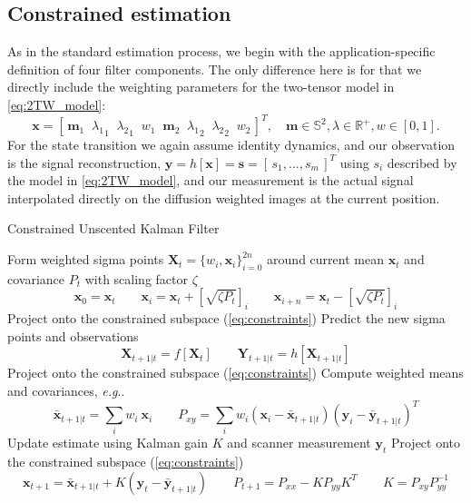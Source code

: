 \documentclass[final,hyperref]{gatech-thesis}
\makeatletter
\renewcommand{\v}[1]{\ensuremath{\mathbf #1}\xspace}
\newcommand{\rv}[1]{\ensuremath{[\, #1 \,]}\xspace} %
\DeclareRobustCommand\onedot{\futurelet\@let@token\@onedot}
\def\@onedot{\ifx\@let@token.\else.\null\fi\xspace}
\newcommand{\eg}{\textit{e.g}\onedot}
\newcommand{\R}{\ensuremath{\mathbb R}}
\renewcommand{\S}{\ensuremath{\mathbb S}}
\newcommand{\s}{\v s}
\newcommand{\m}{\v m}
\newcommand{\lx}{{\ensuremath{\lambda_1}} \xspace}
\newcommand{\ly}{{\ensuremath{\lambda_2}} \xspace}
\newcommand{\x}{\v x}
\newcommand{\y}{\v y}
\newcommand{\X}{\v X}
\newcommand{\Y}{\v Y}
\makeatother
\begin{document}
\subsection{Constrained estimation} \label{sec:cukf}

As in the standard estimation process, we begin with the application-specific
definition of four filter components.  The only difference here is for that we
directly include the weighting parameters for the two-tensor model in
\autoref{eq:2TW_model}:
\begin{equation} \label{eq:2TW_state}
  \x = \rv{ \m_1 \;\; \lx_1 \;\; \ly_1 \;\; w_1 \;\;
            \m_2 \;\; \lx_2 \;\; \ly_2 \;\; w_2 }^T ,
  \quad
  \m\in\S^2, \lambda\in\R^{+}, w\in[0,1] .
\end{equation}
For the state transition we again assume identity dynamics, and our
observation is the signal reconstruction, $\y=h[\x]=\s=\rv{s_1,...,s_m}^T$
using $s_i$ described by the model in \autoref{eq:2TW_model}, and our
measurement is the actual signal interpolated directly on the diffusion
weighted images at the current position.

\begin{algorithm}[t]
  \setlength\abovedisplayskip{2pt}
  \setlength\belowdisplayskip{2pt}
  \caption{Constrained Unscented Kalman Filter}
  \label{alg:cukf}
  \begin{algorithmic}[1]
    \STATE Form weighted sigma points $\X_t=\{w_i, \x_i\}_{i=0}^{2n}$ around
    current mean $\x_t$ and covariance $P_t$ with scaling factor $\zeta$
    \begin{equation*}
      \x_0 = \x_t
      \qquad
      \x_i    = \x_t + [\sqrt{\zeta P_t}]_i
      \qquad
      \x_{i+n} = \x_t - [\sqrt{\zeta P_t}]_i
    \end{equation*}
    \STATE Project onto the constrained subspace (\autoref{eq:constraints})
    \STATE Predict the new sigma points and observations
    \begin{equation*}
      \X_{t+1|t} = f[\X_t]   \qquad   \Y_{t+1|t} = h[\X_{t+1|t}]
    \end{equation*}
    \STATE Project onto the constrained subspace (\autoref{eq:constraints})
    \STATE Compute weighted means and covariances, \eg
    \begin{equation*}
      \bar{\x}_{t+1|t} = \sum_i w_i ~ \x_i
      \qquad
      P_{xy} = \sum_i w_i (\x_i - \bar{\x}_{t+1|t})(\y_i - \bar{\y}_{t+1|t})^T
    \end{equation*}
    \STATE Update estimate using Kalman gain $K$ and scanner measurement
    $\y_t$
    \STATE Project onto the constrained subspace (\autoref{eq:constraints})
    \begin{equation*}
      \x_{t+1} = \bar{\x}_{t+1|t} + K(\y_t - \bar{\y}_{t+1|t})
      \qquad
      P_{t+1} = P_{xx} - K P_{yy} K^T
      \qquad
      K = P_{xy}P_{yy}^{-1}
    \end{equation*}
  \end{algorithmic}
\end{algorithm}
\end{document}
